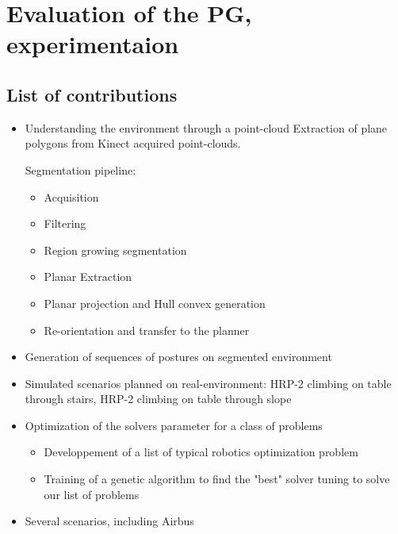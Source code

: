 \chapter{
  Evaluation of the PG, experimentaion
}

\section{List of contributions}
\begin{itemize}
  \item Understanding the environment through a point-cloud
    Extraction of plane polygons from Kinect acquired point-clouds.

    Segmentation pipeline:
    \begin{itemize}
      \item Acquisition
      \item Filtering
      \item Region growing segmentation
      \item Planar Extraction
      \item Planar projection and Hull convex generation
      \item Re-orientation and transfer to the planner
    \end{itemize}
  \item Generation of sequences of postures on segmented environment
  \item{Simulated scenarios planned on real-environment: HRP-2 climbing on table through stairs, HRP-2 climbing on table through slope}
  \item{Optimization of the solvers parameter for a class of problems}
    \begin{itemize}
      \item Developpement of a list of typical robotics optimization problem
      \item Training of a genetic algorithm to find the "best" solver tuning to solve our list of problems
    \end{itemize}
  \item{Several scenarios, including Airbus}
\end{itemize}
